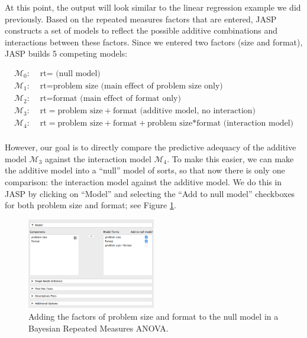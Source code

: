 \documentclass[english,,doc,floatsintext]{apa6}
\begin{document}
At this point, the output will look similar to the linear regression example we did previously. Based on the repeated measures factors that are entered, JASP constructs a set of models to reflect the possible additive combinations and interactions between these factors. Since we entered two factors (size and format), JASP builds 5 competing models:

\begin{align*}
  \mathcal{M}_{0}: & \text{ rt} = \text{ (null model)}\\
  \mathcal{M}_{1}: & \text{ rt} = \text{problem size} \text{ (main effect of problem size only)}\\
  \mathcal{M}_{2}: & \text{ rt} = \text{format} \text{ (main effect of format only)}\\
  \mathcal{M}_{3}: & \text{ rt} = \text{problem size}+\text{format} \text{ (additive model, no interaction)}\\
  \mathcal{M}_{4}: & \text{ rt} = \text{problem size}+\text{format}+\text{problem size*format} \text{ (interaction model)}\\
\end{align*}

However, our goal is to directly compare the predictive adequacy of the additive model \(\mathcal{M}_3\) against the interaction model \(\mathcal{M}_4\). To make this easier, we can make the additive model into a \enquote{null} model of sorts, so that now there is only one comparison: the interaction model against the additive model. We do this in JASP by clicking on \enquote{Model} and selecting the \enquote{Add to null model} checkboxes for both problem size and format; see Figure \ref{fig:repeatedMeasures2}.

\begin{figure}
\centering
\includegraphics[width=0.5\textwidth,height=\textheight]{figures/repeatedMeasures2.png}
\caption{\label{fig:repeatedMeasures2}Adding the factors of problem size and format to the null model in a Bayesian Repeated Measures ANOVA.}
\end{figure}
\end{document}
